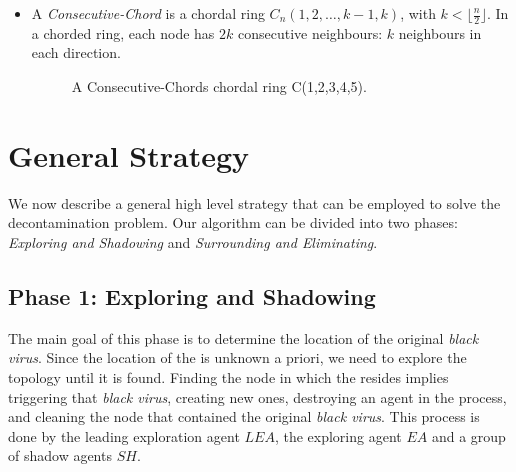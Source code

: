 \begin{itemize}
\item A {\em Consecutive-Chord} is a chordal ring  $C_n(1,2,\ldots,k-1,k)$, with  $k < \lfloor\frac{n}{2}\rfloor$.
 In a  chorded ring, each node  has $2k$ consecutive  neighbours: $k$ neighbours in each direction. 


\begin{figure}[h!]
  \centering
  \caption{A Consecutive-Chords chordal ring C(1,2,3,4,5).}
\end{figure}

\end{itemize}











\section{General Strategy}

 We now describe a general high level strategy that can be employed to solve  
  the \bv decontamination problem. 
  Our algorithm  can be divided into two phases: {\it Exploring and Shadowing} and {\it Surrounding and Eliminating}.

\subsection{Phase 1: Exploring and Shadowing}
The main goal of this phase is to determine the location of the original {\it black virus}. Since the location of the \bv is unknown a priori, we need to explore the topology until it is found. Finding the node in which the \bv resides implies triggering that {\it black virus}, creating new ones, destroying an agent in the process, and cleaning the node that contained the original  {\it black virus}. This process is done by the  leading exploration agent $LEA$, the exploring agent $EA$ and a group of shadow agents $SH$. 


